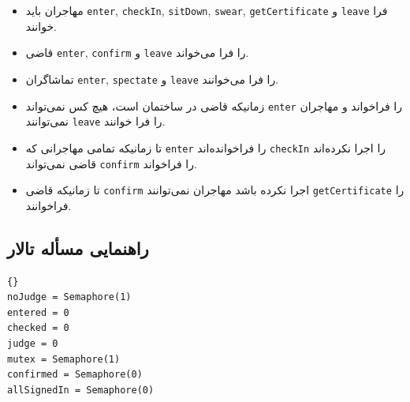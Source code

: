 \documentclass{book}
\newcommand{\clearemptydoublepage}{\newpage\cleardoublepage}
\begin{document}
\begin{itemize}

\item %
    مهاجران باید {\tt enter}, {\tt checkIn}, {\tt sitDown}, {\tt swear}, {\tt getCertificate} و {\tt leave} 
    فرا خوانند. 

\item %
    قاضی {\tt enter}, {\tt confirm} و {\tt leave}  را فرا می‌خواند. 

\item%
    تماشاگران {\tt enter}, {\tt spectate} و {\tt leave} را فرا می‌خوانند. 

\item %
    زمانیکه قاضی در ساختمان است، هیچ کس نمی‌تواند {\tt enter} را فراخواند و مهاجران نمی‌توانند  {\tt leave} را فرا خوانند. 

\item %
    تا زمانیکه تمامی مهاجرانی که {\tt enter} را فراخوانده‌اند  {\tt checkIn} را  اجرا نکرده‌اند  قاضی نمی‌تواند  {\tt confirm} را فراخواند.

\item %
    تا زمانیکه قاضی {\tt confirm} اجرا نکرده باشد مهاجران نمی‌توانند {\tt getCertificate} را فراخوانند. 

\end{itemize}

\clearemptydoublepage
\subsection{راهنمایی مسأله تالار }

\begin{latin}
\begin{lstlisting}[title=\rl{راهنمایی مسأله تالار \lr{Faneuil}}]{}
noJudge = Semaphore(1)
entered = 0
checked = 0
judge = 0
mutex = Semaphore(1)
confirmed = Semaphore(0)
allSignedIn = Semaphore(0)
\end{lstlisting}
\end{latin}
\end{document}
